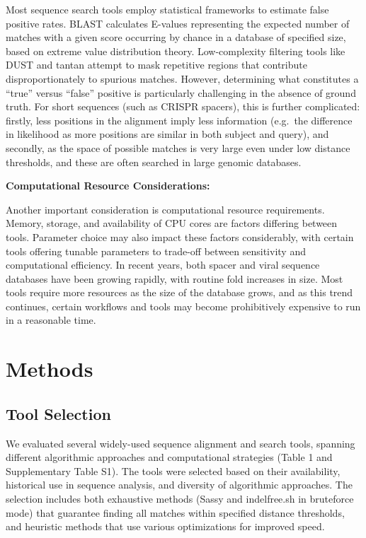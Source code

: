 \documentclass[
]{article}
\begin{document}
Most sequence search tools employ statistical frameworks to estimate
false positive rates. BLAST calculates E-values representing the
expected number of matches with a given score occurring by chance in a
database of specified size, based on extreme value distribution
theory\autocite{Altschul1990_blast}. Low-complexity filtering tools like
DUST\autocite{Morgulis_2006} and tantan\autocite{Frith_2010} attempt to
mask repetitive regions that contribute disproportionately to spurious
matches. However, determining what constitutes a ``true'' versus
``false'' positive is particularly challenging in the absence of ground
truth. For short sequences (such as CRISPR spacers), this is further
complicated: firstly, less positions in the alignment imply less
information (e.g.~the difference in likelihood as more positions are
similar in both subject and query), and secondly, as the space of
possible matches is very large even under low distance thresholds, and
these are often searched in large genomic databases.

\textbf{Computational Resource Considerations:}

Another important consideration is computational resource requirements.
Memory, storage, and availability of CPU cores are factors differing
between tools. Parameter choice may also impact these factors
considerably, with certain tools offering tunable parameters to
trade-off between sensitivity and computational efficiency. In recent
years, both spacer and viral sequence databases have been growing
rapidly, with routine fold increases in
size\autocite{Shmakov_2017,Dion_2021,camargo_img_vr4_2023}. Most tools
require more resources as the size of the database grows, and as this
trend continues, certain workflows and tools may become prohibitively
expensive to run in a reasonable time.

\section{Methods}\label{sec-methods}

\subsection{Tool Selection}\label{sec-tool-selection}

We evaluated several widely-used sequence alignment and search tools,
spanning different algorithmic approaches and computational strategies
(Table 1 and Supplementary Table S1). The tools were selected based on
their availability, historical use in sequence analysis, and diversity
of algorithmic approaches. The selection includes both exhaustive
methods (Sassy and indelfree.sh in bruteforce mode) that guarantee
finding all matches within specified distance thresholds, and heuristic
methods that use various optimizations for improved speed.
\end{document}
